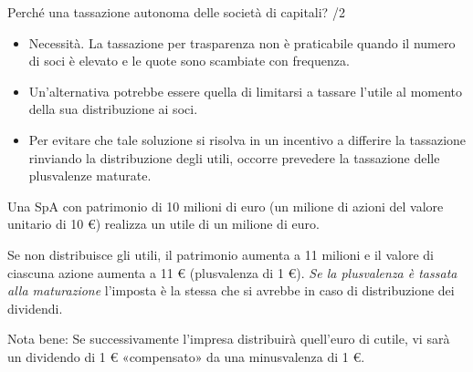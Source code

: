\documentclass[aspectratio=149,11pt,italian]{beamer}
\begin{document}
\begin{frame}{Perché una tassazione autonoma delle società di capitali? /2}
\begin{itemize}
\item \alert{Necessità.} La tassazione per trasparenza non è praticabile quando il
numero di soci è elevato e le quote sono scambiate con frequenza.
\item Un'alternativa potrebbe essere quella di limitarsi a tassare l'utile al
momento della sua distribuzione ai soci.
\item Per evitare che tale soluzione si risolva in un incentivo a differire la
tassazione rinviando la distribuzione degli utili, occorre prevedere la
tassazione delle plusvalenze maturate.
\end{itemize}
\begin{block}{}
\small
Una SpA con patrimonio di 10 milioni di euro (un milione di azioni
del valore unitario di 10 €) realizza un utile di un milione di euro.

Se non distribuisce gli utili, il patrimonio aumenta a 11 milioni e il
valore di ciascuna azione aumenta a 11 € (plusvalenza di 1 €). \emph{Se la
plusvalenza è tassata alla maturazione} l'imposta è la stessa che si avrebbe
in caso di distribuzione dei dividendi.

Nota bene: Se successivamente l'impresa distribuirà quell'euro di
cutile, vi sarà un dividendo di 1 € «compensato» da una minusvalenza di 1 €.
\end{block}

\end{frame}
\end{document}
